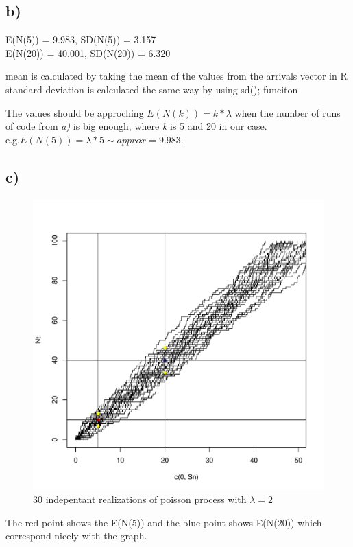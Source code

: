 \documentclass[a4paper, 11pt]{article}
\begin{document}
\subsection*{b)}
E(N(5)) = 9.983, SD(N(5)) = 3.157\\
E(N(20)) = 40.001, SD(N(20)) = 6.320

mean is calculated by taking the mean of the values from the arrivals vector in R\\
standard deviation is calculated the same way by using sd(); funciton

The values should be approching $E(N(k)) = k * \lambda$ when the number of runs of code from \emph{a)} is big enough, where \emph{k} is 5 and 20 in our case. \\e.g.$E(N(5)) = \lambda *5 \sim approx = 9.983.$

\subsection*{c)}
\begin{figure}[H]
  \centering
  \includegraphics[scale=0.9,page=1]{Rplots3.pdf}
  \caption{30 indepentant realizations of poisson process with $\lambda = 2$}
  \label{poisproc}
\end{figure}

The red point shows the E(N(5)) and the blue point shows E(N(20)) which correspond nicely with the graph.
\end{document}
